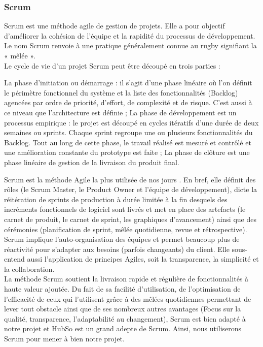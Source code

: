 \subsubsection{Scrum}
Scrum est une méthode agile de gestion de projets. Elle a pour objectif d’améliorer la cohésion de
l’équipe et la rapidité du processus de développement. Le nom Scrum renvoie à une pratique généralement connue au rugby signifiant la « mêlée ».\\
Le cycle de vie d’un projet Scrum peut être découpé en trois parties :
\begin{itemize}
	\itemcheck La phase d’initiation ou démarrage : il s’agit d’une phase linéaire où l’on
	définit le périmètre fonctionnel du système et la liste des fonctionnalités
	(Backlog) agencées par ordre de priorité, d’effort, de complexité et de risque.
	C’est aussi à ce niveau que l’architecture est définie ;
	\itemcheck La phase de développement est un processus empirique : le projet est découpé
	en cycles itératifs d’une durée de deux semaines ou sprints. Chaque sprint
	regroupe une ou plusieurs fonctionnalités du Backlog. Tout au long de cette
	phase, le travail réalisé est mesuré et contrôlé et une amélioration constante du
	prototype est faite ;
	\itemcheck La phase de clôture est une phase linéaire de gestion de la livraison du produit
	final.
\end{itemize}
Scrum est la méthode Agile la plus utilisée de nos jours \cite{scrum}. En bref, elle définit des rôles (le Scrum Master, le Product Owner et l’équipe de développement), dicte la réitération de sprints de production à durée limitée à la fin desquels des incréments fonctionnels de logiciel sont livrés et met en place des artefacts (le carnet de produit, le carnet de sprint, les graphiques d’avancement) ainsi que des cérémonies (planification de sprint, mêlée quotidienne, revue et rétrospective).
Scrum implique l’auto-organisation des équipes et permet beaucoup plus de réactivité pour s’adapter aux besoins (parfois changeants) du client. Elle sous-entend aussi l’application de principes Agiles, soit la transparence, la simplicité et la collaboration.\\
La méthode Scrum soutient la livraison rapide et régulière de fonctionnalités à haute valeur ajoutée.
Du fait de sa facilité d'utilisation, de l'optimisation de l'efficacité de ceux qui l'utilisent grâce à des mêlées quotidiennes permettant de lever tout obstacle ainsi que de ses nombreux autres avantages (Focus sur la qualité, transparence, l'adaptabilité au changement), Scrum est bien adapté à notre projet et HubSo est un grand adepte de Scrum. Ainsi, nous utiliserons Scrum pour mener à bien notre projet.

